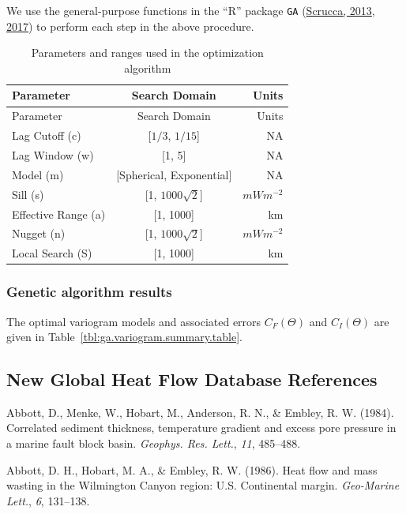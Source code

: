 \documentclass[draft,linenumbers]{agujournal2018}
\begin{document}
We use the general-purpose functions in the ``R'' package \texttt{GA}
(\protect\hyperlink{ref-scrucca2013}{Scrucca, 2013},
\protect\hyperlink{ref-scrucca2017}{2017}) to perform each step in the
above procedure.

\hypertarget{tbl:search}{}
\begin{longtable}[]{@{}lcr@{}}
\caption{\label{tbl:search}Parameters and ranges used in the
optimization algorithm}\tabularnewline
\toprule
Parameter & Search Domain & Units \\
\midrule
\endfirsthead
\toprule
Parameter & Search Domain & Units \\
\midrule
\endhead
Lag Cutoff (c) & {[}\(1/3\), \(1/15\){]} & NA \\
Lag Window (w) & {[}1, 5{]} & NA \\
Model (m) & {[}Spherical, Exponential{]} & NA \\
Sill (s) & {[}1, \(1000\sqrt{2}\){]} & \(mWm^{-2}\) \\
Effective Range (a) & {[}1, 1000{]} & km \\
Nugget (n) & {[}1, \(1000\sqrt{2}\){]} & \(mWm^{-2}\) \\
Local Search (S) & {[}1, 1000{]} & km \\
\bottomrule
\end{longtable}

\subsubsection{Genetic algorithm results}

The optimal variogram models and associated errors \(C_F(\Theta)\) and
\(C_I(\Theta)\) are given in Table~\ref{tbl:ga.variogram.summary.table}.

\clearpage

\subsection{New Global Heat Flow Database References}

\hypertarget{refs_nghf}{}
\leavevmode{}%
Abbott, D., Menke, W., Hobart, M., Anderson, R. N., \& Embley, R. W.
(1984). Correlated sediment thickness, temperature gradient and excess
pore pressure in a marine fault block basin. \emph{Geophys. Res. Lett.},
\emph{11}, 485--488.

\leavevmode{}%
Abbott, D. H., Hobart, M. A., \& Embley, R. W. (1986). Heat flow and
mass wasting in the {Wilmington Canyon} region: {U.S.} Continental
margin. \emph{Geo-Marine Lett.}, \emph{6}, 131--138.
\end{document}
